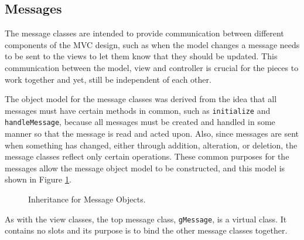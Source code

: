 \documentclass{article}[11pt]
\newcommand{\Rfunction}[1]{{\texttt{#1}}}
\newcommand{\Robject}[1]{{\texttt{#1}}}
\begin{document}
\subsection{Messages}\label{Ssec:OneMess}

The message classes are intended to provide communication between different
components of the MVC design, such as when the model changes a message needs to
be sent to the views to let them know that they should be updated.  This
communication between the model, view and controller is crucial for the pieces
to work together and yet, still be independent of each other.  

The object model for the message classes was derived from the idea that all
messages must have certain methods in common, such as \Rfunction{initialize}
and \Rfunction{handleMessage}, because all messages must be created and
handled in some manner so that the message is read and acted upon.  Also,
since messages are sent when something has changed, either through addition,
alteration, or deletion, the message classes reflect only certain operations.
These common purposes for the messages allow the message object model to be
constructed, and this model is shown in Figure \ref{Fig:Mess}.

\begin{figure}[ht]
  \begin{center}
    \caption{ Inheritance for Message Objects. }
    \label{Fig:Mess}
  \end{center}
\end{figure}

As with the view classes, the top message class, \Robject{gMessage}, is a
virtual class.  It contains no slots and its purpose is to bind the other
message classes together.
\end{document}
